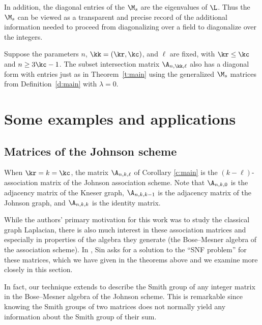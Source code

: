 \begin{remark}
In addition, the diagonal entries of the $\M_s$ are the eigenvalues of $\L$.  Thus the $\M_s$ can be viewed as a transparent and precise record of the additional information needed to proceed from diagonalizing over a field to diagonalize over the integers.
\end{remark}

\begin{corollary}\label{c:main}
Suppose the parameters $n$, $\kk = (\kr,\kc)$, and $\ell$ are fixed, with $\kr \leq \kc$ and $n \geq 3\kc-1$.
The subset intersection matrix $\A_{n, \kk, \ell}$ also has a diagonal form with entries just as in Theorem~\ref{t:main} using the generalized $\M_s$ matrices from Definition~\ref{d:main} with $\lambda = 0$.
\end{corollary}



\section{Some examples and applications}\label{s:examples}


\subsection{Matrices of the Johnson scheme}
When $\kr = k = \kc$, the matrix $\A_{n, k, \ell}$ of Corollary \ref{c:main} is the $(k-\ell)$-association matrix of the Johnson association scheme. Note that $\A_{n,k,0}$ is the adjacency matrix of the Kneser graph, $\A_{n,k, k-1}$ is the adjacency matrix of the Johnson graph, and $\A_{n,k,k}$ is the identity matrix. 

While the authors' primary motivation for this work was to study the classical graph Laplacian, there is also much interest in these association matrices and especially in properties of the algebra they generate (the Bose--Mesner algebra of the association scheme).  In \cite[Problem 3.7]{snf-inc}, Sin asks for a solution to the ``SNF problem'' for these matrices, which we have given in the theorems above and we examine more closely in this section.  

In fact, our technique extends to describe the Smith group of any integer matrix in the Bose--Mesner algebra of the Johnson scheme.  This is remarkable since knowing the Smith groups of two matrices does not normally yield any information about the Smith group of their sum.  

